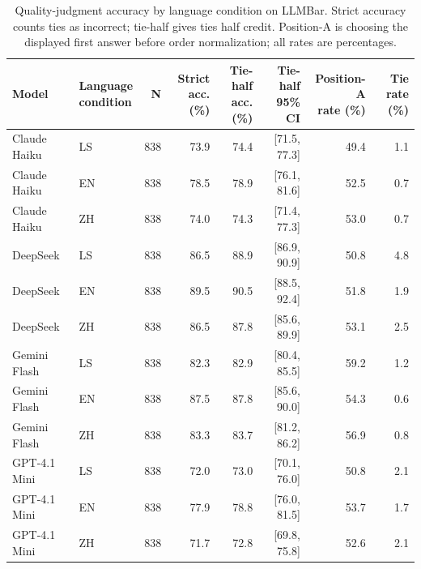 \begin{table}[t]
\centering
\small
\setlength{\tabcolsep}{6pt}
\renewcommand{\arraystretch}{1.08}
\begin{tabular}{llrrrrrr}
\hline
Model & \shortstack{Language\\condition} & N & \shortstack{Strict\\acc. (\%)} & \shortstack{Tie-half\\acc. (\%)} & \shortstack{Tie-half\\95\% CI} & \shortstack{Position-A\\rate (\%)} & \shortstack{Tie\\rate (\%)} \\
\hline
Claude Haiku & LS & 838 & 73.9 & 74.4 & [71.5, 77.3] & 49.4 & 1.1 \\
Claude Haiku & EN & 838 & 78.5 & 78.9 & [76.1, 81.6] & 52.5 & 0.7 \\
Claude Haiku & ZH & 838 & 74.0 & 74.3 & [71.4, 77.3] & 53.0 & 0.7 \\
DeepSeek & LS & 838 & 86.5 & 88.9 & [86.9, 90.9] & 50.8 & 4.8 \\
DeepSeek & EN & 838 & 89.5 & 90.5 & [88.5, 92.4] & 51.8 & 1.9 \\
DeepSeek & ZH & 838 & 86.5 & 87.8 & [85.6, 89.9] & 53.1 & 2.5 \\
Gemini Flash & LS & 838 & 82.3 & 82.9 & [80.4, 85.5] & 59.2 & 1.2 \\
Gemini Flash & EN & 838 & 87.5 & 87.8 & [85.6, 90.0] & 54.3 & 0.6 \\
Gemini Flash & ZH & 838 & 83.3 & 83.7 & [81.2, 86.2] & 56.9 & 0.8 \\
GPT-4.1 Mini & LS & 838 & 72.0 & 73.0 & [70.1, 76.0] & 50.8 & 2.1 \\
GPT-4.1 Mini & EN & 838 & 77.9 & 78.8 & [76.0, 81.5] & 53.7 & 1.7 \\
GPT-4.1 Mini & ZH & 838 & 71.7 & 72.8 & [69.8, 75.8] & 52.6 & 2.1 \\
\hline
\end{tabular}
\caption{Quality-judgment accuracy by language condition on LLMBar. Strict accuracy counts ties as incorrect; tie-half gives ties half credit. Position-A is choosing the displayed first answer before order normalization; all rates are percentages.}
\label{tab:quality}
\end{table}

